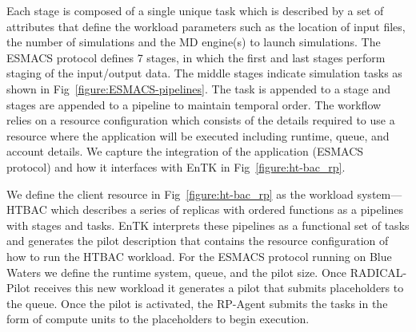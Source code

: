 
Each stage is composed of a single unique task which is described by a set of
attributes that define the workload parameters such as the location of input
files, the number of simulations and the MD engine(s) to launch simulations.
The ESMACS protocol defines 7 stages, in which the first and last
stages perform staging of the input/output data. The middle stages indicate
simulation tasks as shown in Fig~\ref{figure:ESMACS-pipelines}. The task is
appended to a stage and stages are appended to a pipeline to maintain
temporal order. The workflow relies on a resource configuration which
consists of the details required to use a resource where the application will
be executed including runtime, queue, and account details. We capture the
integration of the application (ESMACS protocol) and how it interfaces with
EnTK in Fig~\ref{figure:ht-bac_rp}.

We define the client resource in Fig~\ref{figure:ht-bac_rp} as the workload
system---HTBAC which describes a series of replicas with ordered functions as
a pipelines with stages and tasks. EnTK interprets these pipelines as a
functional set of tasks and generates the pilot description that contains the
resource configuration of how to run the HTBAC workload. For the ESMACS
protocol running on Blue Waters we define the runtime system, queue, and the
pilot size. Once RADICAL-Pilot receives this new workload it generates a
pilot that submits placeholders to the queue. Once the pilot is activated,
the RP-Agent submits the tasks in the form of compute units to the
placeholders to begin execution.

